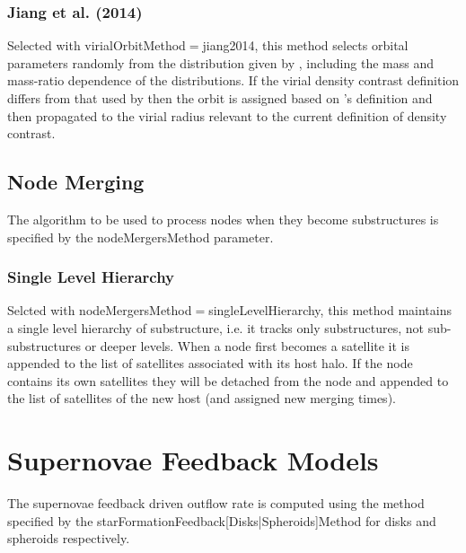 \subsubsection{Jiang et al. (2014)}\label{phys:virialOrbit:virialOrbitJiang2014}

Selected with {\normalfont \ttfamily virialOrbitMethod}$=${\normalfont \ttfamily jiang2014}, this method selects orbital parameters randomly from the distribution given by \cite{jiang_orbital_2014}, including the mass and mass-ratio dependence of the distributions. If the virial density contrast definition differs from that used by \cite{jiang_orbital_2014} then the orbit is assigned based on \cite{jiang_orbital_2014}'s definition and then propagated to the virial radius relevant to the current definition of density contrast.

\subsection{Node Merging}

The algorithm to be used to process nodes when they become substructures is specified by the {\normalfont \ttfamily nodeMergersMethod} parameter.

\subsubsection{Single Level Hierarchy}

Selcted with {\normalfont \ttfamily nodeMergersMethod}$=${\normalfont \ttfamily singleLevelHierarchy}, this method maintains a single level hierarchy of substructure, i.e. it tracks only substructures, not sub-substructures or deeper levels. When a \gls{node} first becomes a satellite it is appended to the list of satellites associated with its host halo. If the \gls{node} contains its own satellites they will be detached from the \gls{node} and appended to the list of satellites of the new host (and assigned new merging times).

\section{Supernovae Feedback Models}\label{sec:sneFeedback}

The supernovae feedback driven outflow rate is computed using the method specified by the {\normalfont \ttfamily starFormationFeedback[Disks|Spheroids]Method} for disks and spheroids respectively.


